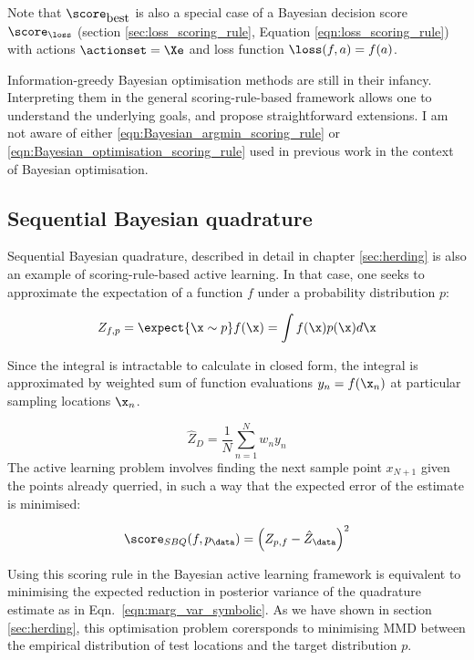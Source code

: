Note that $\score_{\mbox{best}}$ is also a special case of a Bayesian decision score $\score_{\loss}$ (section \ref{sec:loss_scoring_rule}, Equation \eqref{eqn:loss_scoring_rule}) with actions $\actionset=\Xe$ and loss function $\loss(f,a)=f(a)$.

Information-greedy Bayesian optimisation methods are still in their infancy. Interpreting them in the general scoring-rule-based framework allows one to understand the underlying goals, and propose straightforward extensions. I am not aware of either \eqref{eqn:Bayesian_argmin_scoring_rule} or \eqref{eqn:Bayesian_optimisation_scoring_rule} used in previous work in the context of Bayesian optimisation.

\subsection{Sequential Bayesian quadrature}

Sequential Bayesian quadrature, described in detail in chapter \ref{sec:herding} is also an example of scoring-rule-based active learning. In that case, one seeks to approximate the expectation of a function $f$ under a probability distribution $p$:

\begin{equation}
	Z_{f,p} = \expect{\x\sim p}f(\x) = \int f(\x) p(\x) d\x
\end{equation}

Since the integral is intractable to calculate in closed form, the integral is approximated by weighted sum of function evaluations $y_n = f(\x_n)$ at particular sampling locations $\x_n$.

\begin{equation}
	\hat{Z}_{D} = \frac{1}{N}\sum_{n=1}^{N} w_n y_n
\end{equation}
 The active learning problem involves finding the next sample point $x_{N+1}$ given the points already querried, in such a way that the expected error of the estimate is minimised:

\begin{equation}
	\score_{SBQ}(f,p_\data) = \left(Z_{p,f} - \hat{Z}_\data \right)^2
\end{equation}

Using this scoring rule in the Bayesian active learning framework is equivalent to minimising the expected reduction in posterior variance of the quadrature estimate as in Eqn.\ \eqref{eqn:marg_var_symbolic}. As we have shown in section \ref{sec:herding}, this optimisation problem corersponds to minimising MMD between the empirical distribution of test locations and the target distribution $p$.

